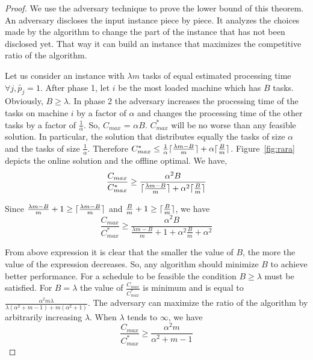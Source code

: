 \documentclass[twocolumn]{svjour3}
\DeclarePairedDelimiter{\ceil}{\lceil}{\rceil}
\begin{document}
\begin{proof}
  We use the adversary technique to prove the lower bound of this
  theorem. An adversary discloses the input instance piece by
  piece. It analyzes the choices made by the algorithm to change the
  part of the instance that has not been disclosed yet. That way it
  can build an instance that maximizes the competitive ratio of the
  algorithm.
 
  Let us consider an instance with $\lambda m$ tasks of equal
  estimated processing time $\forall j, \tilde{p_j} = 1$. After phase
  1, let $i$ be the most loaded machine which has $B$
  tasks. Obviously, $B \geq \lambda$. In phase 2 the adversary
  increases the processing time of the tasks on machine $i$ by a
  factor of $\alpha$ and changes the processing time of the other
  tasks by a factor of $\frac{1}{\alpha}$. So, $ C_{max}$ = $\alpha
  B$. ${C^{*}_{max}}$ will be no worse than any feasible solution. In
  particular, the solution that distributes equally the tasks of size
  $\alpha$ and the tasks of size $\frac{1}{\alpha}$. Therefore
  ${C^{*}_{max}} \leq \frac{1}{\alpha }\ceil {\frac{\lambda m - B
    }{m}}+ \alpha\ceil{\frac{B}{m}} $.  Figure~\ref{fig:rara} depicts
  the online solution and the offline optimal. We have,
 \begin{equation}\nonumber
   \frac{C_{max}}{C^{*}_{max}}
   \geq \frac{\alpha^{2} B  }{\ceil{\frac{
        \lambda m - B }{m}}+\alpha^2\ceil{\frac{B}{m}}}
 \end{equation}
   
 Since $\frac{ \lambda m - B }{m} +1 \geq\ceil{\frac{ \lambda m - B
   }{m}}$ and $\frac{B}{m}+1\geq\ceil{\frac{B}{m}}$, we have
 \begin{equation}\nonumber
   \frac{C_{max}}{C^{*}_{max}}
   \geq \frac{\alpha^{2} B  }{\frac{
       \lambda m - B }{m}+1+\alpha^2\frac{B}{m}+\alpha^{2}}
 \end{equation}
 
 From above expression it is clear that the smaller the value of $B$, the more the
 value of the expression decreases. So, any algorithm should minimize
 $B$ to achieve better performance.  For a schedule to be feasible the
 condition $B \geq \lambda$ must be satisfied. For $B = \lambda$ the
 value of $\frac{C_{max}}{C^{*}_{max}}$ is minimum and is equal to
 $\frac{\alpha^{2} m \lambda }{\lambda(\alpha^{2}+m-1)+
   m(\alpha^{2}+1)}$. The adversary can maximize the ratio of the
 algorithm by arbitrarily increasing $\lambda$. When $\lambda$ tends
 to $\infty$, we have
 \begin{equation}\nonumber
       \frac{C_{max}}{C^{*}_{max}}
       \geq \frac{\alpha^{2}m  }{\alpha^{2}+m-1}
     \end{equation}
 


\end{proof}
\end{document}
